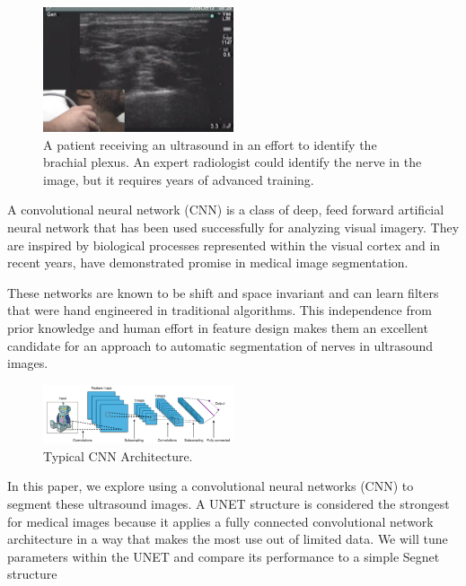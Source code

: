 \documentclass[letterpaper]{article}
\begin{document}
 \begin{figure}[H]
  \centerline{\includegraphics[width=0.5\textwidth]{Images/UltrasoundNerve.png}}
  \caption{A patient receiving an ultrasound in an effort to identify the brachial plexus. An expert radiologist could identify the nerve in the image, but it requires years of advanced training.}
  \label{fig:cnnarchitecture}
\end{figure}

A convolutional neural network (CNN) is a class of deep, feed forward artificial neural network that has been used successfully for analyzing visual imagery. They are inspired by biological processes represented within the visual cortex and in recent years, have demonstrated promise in medical image segmentation. 

These networks are known to be shift and space invariant and can learn filters that were hand engineered in traditional algorithms. This independence from prior knowledge and human effort in feature design makes them an excellent candidate for an approach to automatic segmentation of nerves in ultrasound images. 



 \begin{figure}[H]
  \centerline{\includegraphics[width=0.5\textwidth]{Images/TypicalCNN.png}}
  \caption{Typical CNN Architecture.}
  \label{fig:cnnarchitecture}
\end{figure}

In this paper, we explore using a convolutional neural networks (CNN) to segment these ultrasound images. A UNET structure is considered the strongest for medical images because it applies a fully connected convolutional network architecture in a way that makes the most use out of limited data.\cite{ronneberger2015u} We will tune parameters within the UNET and compare its  performance to a simple Segnet structure 
\end{document}
